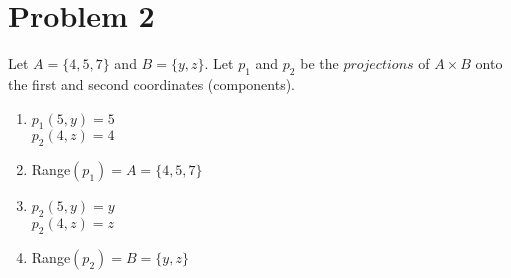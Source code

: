 \documentclass[11pt]{article}
\begin{document}
\section*{Problem 2}
Let $A = \{4,5,7\}$ and $B = \{y,z\}$. Let $p_1$ and $p_2$ be the $projections$ of $A \times B$ onto the first and second coordinates (components).
\begin{enumerate}
    \item 
    $p_1 (5,y) = \boxed{5}$\\
    $p_2(4,z) = \boxed{4}$
    \item
    Range$(p_1) = \boxed{A} = \{4, 5, 7\}$
    \item
    $p_2 (5,y) = \boxed{y}$\\
    $p_2(4,z) = \boxed{z}$
    \item
    Range$(p_2) = \boxed{B}= \{y, z\}$
    
\end{enumerate}

\newpage
\end{document}
